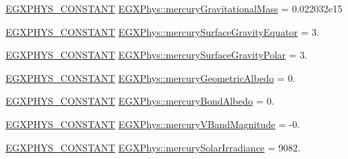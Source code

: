 \begin{DoxyCompactItemize}
\item 
\mbox{\hyperlink{group___e_g_x_phys-_constants-_macros_ga76980d288494ce1714c9ac68a95ba702}{E\+G\+X\+P\+H\+Y\+S\+\_\+\+C\+O\+N\+S\+T\+A\+NT}} \mbox{\hyperlink{group___e_g_x_phys-_constants-_astrophysics-_solar_system-_mercury-_bulk_ga2f4f05dcf67675d3d11731cbd7f0eaba}{E\+G\+X\+Phys\+::mercury\+Gravitational\+Mass}} = 0.\+022032e15
\item 
\mbox{\hyperlink{group___e_g_x_phys-_constants-_macros_ga76980d288494ce1714c9ac68a95ba702}{E\+G\+X\+P\+H\+Y\+S\+\_\+\+C\+O\+N\+S\+T\+A\+NT}} \mbox{\hyperlink{group___e_g_x_phys-_constants-_astrophysics-_solar_system-_mercury-_bulk_ga82c6a427ba4ba310574c522cff333693}{E\+G\+X\+Phys\+::mercury\+Surface\+Gravity\+Equator}} = 3.
\item 
\mbox{\hyperlink{group___e_g_x_phys-_constants-_macros_ga76980d288494ce1714c9ac68a95ba702}{E\+G\+X\+P\+H\+Y\+S\+\_\+\+C\+O\+N\+S\+T\+A\+NT}} \mbox{\hyperlink{group___e_g_x_phys-_constants-_astrophysics-_solar_system-_mercury-_bulk_ga7fdbe2d882ff39cc6151ed1c9afb93f7}{E\+G\+X\+Phys\+::mercury\+Surface\+Gravity\+Polar}} = 3.
\item 
\mbox{\hyperlink{group___e_g_x_phys-_constants-_macros_ga76980d288494ce1714c9ac68a95ba702}{E\+G\+X\+P\+H\+Y\+S\+\_\+\+C\+O\+N\+S\+T\+A\+NT}} \mbox{\hyperlink{group___e_g_x_phys-_constants-_astrophysics-_solar_system-_mercury-_bulk_ga98cc52c8bad157ae9ec6be798afb261c}{E\+G\+X\+Phys\+::mercury\+Geometric\+Albedo}} = 0.
\item 
\mbox{\hyperlink{group___e_g_x_phys-_constants-_macros_ga76980d288494ce1714c9ac68a95ba702}{E\+G\+X\+P\+H\+Y\+S\+\_\+\+C\+O\+N\+S\+T\+A\+NT}} \mbox{\hyperlink{group___e_g_x_phys-_constants-_astrophysics-_solar_system-_mercury-_bulk_ga2bc9c9b9a62a05dda96ee4fa281aad24}{E\+G\+X\+Phys\+::mercury\+Bond\+Albedo}} = 0.
\item 
\mbox{\hyperlink{group___e_g_x_phys-_constants-_macros_ga76980d288494ce1714c9ac68a95ba702}{E\+G\+X\+P\+H\+Y\+S\+\_\+\+C\+O\+N\+S\+T\+A\+NT}} \mbox{\hyperlink{group___e_g_x_phys-_constants-_astrophysics-_solar_system-_mercury-_bulk_gab4b0edd36ba34de13b19370f854a8f2c}{E\+G\+X\+Phys\+::mercury\+V\+Band\+Magnitude}} = -\/0.
\item 
\mbox{\hyperlink{group___e_g_x_phys-_constants-_macros_ga76980d288494ce1714c9ac68a95ba702}{E\+G\+X\+P\+H\+Y\+S\+\_\+\+C\+O\+N\+S\+T\+A\+NT}} \mbox{\hyperlink{group___e_g_x_phys-_constants-_astrophysics-_solar_system-_mercury-_bulk_ga36990b1744cb8a5cfaaf68771dde41fd}{E\+G\+X\+Phys\+::mercury\+Solar\+Irradiance}} = 9082.

\end{DoxyCompactItemize}
